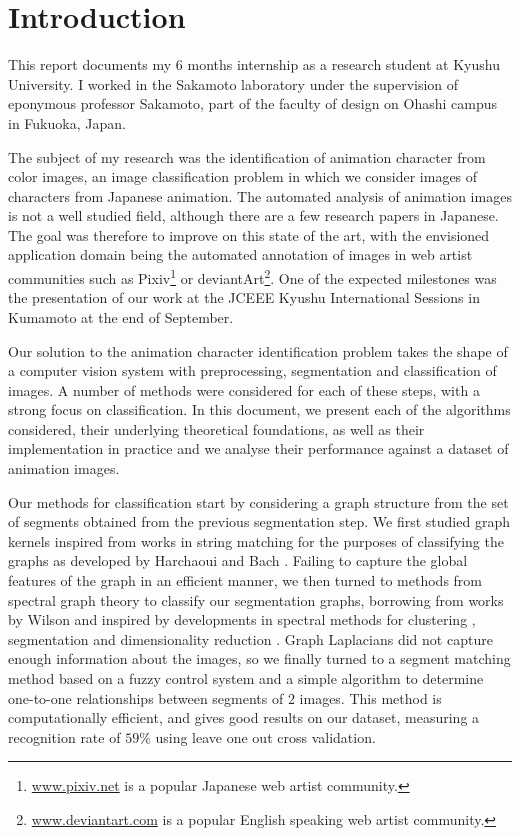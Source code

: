 \section*{Introduction}
This report documents my $6$ months internship as a research student at Kyushu University. I worked in the Sakamoto laboratory under the supervision of eponymous professor Sakamoto, part of the faculty of design on Ohashi campus in Fukuoka, Japan.

The subject of my research was the identification of animation character from color images, an image classification problem in which we consider images of characters from Japanese animation. The automated analysis of animation images is not a well studied field, although there are a few research papers in Japanese. The goal was therefore to improve on this state of the art, with the envisioned application domain being the automated annotation of images in web artist communities such as Pixiv\footnote{
\url{www.pixiv.net} is a popular Japanese web artist community.
} or deviantArt\footnote{
\url{www.deviantart.com} is a popular English speaking web artist community.
}. One of the expected milestones was the presentation of our work at the JCEEE Kyushu International Sessions in Kumamoto at the end of September.

Our solution to the animation character identification problem takes the shape of a computer vision system with preprocessing, segmentation and classification of images. A number of methods were considered for each of these steps, with a strong focus on classification. In this document, we present each of the algorithms considered, their underlying theoretical foundations, as well as their implementation in practice and we analyse their performance against a dataset of animation images.

Our methods for classification start by considering a graph structure from the set of segments obtained from the previous segmentation step. We first studied graph kernels inspired from works in string matching for the purposes of classifying the graphs as developed by Harchaoui and Bach \cite{harchaoui2007image}. Failing to capture the global features of the graph in an efficient manner, we then turned to methods from spectral graph theory to classify our segmentation graphs, borrowing from works by Wilson \cite{harchaoui2007image}
\cite{wilson2005pattern} and inspired by developments in spectral methods for clustering \cite{ng2002spectral}, segmentation \cite{shi2000normalized} and dimensionality reduction \cite{roweis2000nonlinear} \cite{belkin2003laplacian}. Graph Laplacians did not capture enough information about the images, so we finally turned to a segment matching method based on a fuzzy control system and a simple algorithm to determine one-to-one relationships between segments of $2$ images. This method is computationally efficient, and gives good results on our dataset, measuring a recognition rate of $59$\% using leave one out cross validation.

